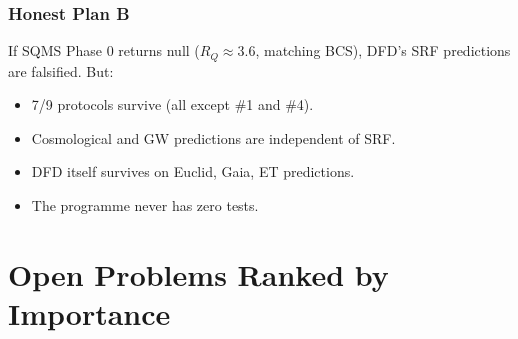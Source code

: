 \documentclass[11pt,a4paper]{article}
\begin{document}
\section{Honest Plan B}

If SQMS Phase 0 returns null ($R_Q \approx 3.6$, matching BCS), DFD's SRF predictions are falsified. But:
\begin{itemize}
\item 7/9 protocols survive (all except \#1 and \#4).
\item Cosmological and GW predictions are independent of SRF.
\item DFD itself survives on Euclid, Gaia, ET predictions.
\item The programme never has zero tests.
\end{itemize}


\part{Open Problems Ranked by Importance}
\label{part:openproblems}
\end{document}
